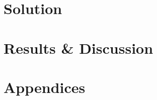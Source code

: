 \documentclass[a4paper, fontsize=11pt]{report} %
\begin{document}








\part{Solution}











\part{Results \& Discussion}









\printbibliography

\listoftables

\listoffigures

\lstlistoflistings

\newpage

\part{Appendices}

\appendix








\end{document}
